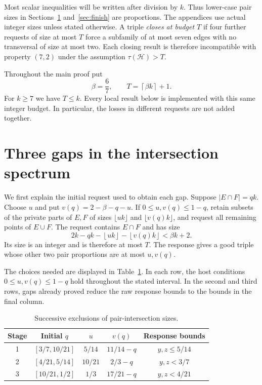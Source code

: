 \documentclass[11pt]{article}
\numberwithin{equation}{section}
\theoremstyle{definition}
\theoremstyle{remark}
\newcommand{\HH}{\mathcal H}
\newcommand{\ceil}[1]{\left\lceil #1\right\rceil}
\newcommand{\floor}[1]{\left\lfloor #1\right\rfloor}
\begin{document}
Most scalar inequalities will be written after division by $k$.
Thus lower-case pair sizes in Sections~\ref{sec:gaps} and~\ref{sec:finish}
are proportions. The appendices use actual integer sizes unless stated
otherwise. A triple \emph{closes at budget $T$} if four further requests
of size at most $T$ force a subfamily of at most seven edges with no
transversal of size at most two. Each closing result is therefore
incompatible with property $(7,2)$ under the assumption $\tau(\HH)>T$.

Throughout the main proof put
\begin{equation}\label{eq:budget}
 \beta=\frac67,\qquad T=\ceil{\beta k}+1.
\end{equation}
For $k\ge7$ we have $T\le k$. Every local result below is implemented
with this same integer budget. In particular, the losses in different
requests are not added together.

\section{Three gaps in the intersection spectrum}\label{sec:gaps}
We first explain the initial request used to obtain each gap. Suppose
$|E\cap F|=qk$. Choose $u$ and put $v(q)=2-\beta-q-u$.
If $0\le u,v(q)\le1-q$, retain subsets of the private parts of $E,F$
of sizes $\lfloor uk\rfloor$ and $\lfloor v(q)k\rfloor$, and request
all remaining points of $E\cup F$. The request contains $E\cap F$ and
has size
\[
 2k-qk-\floor{uk}-\floor{v(q)k}<\beta k+2.
\]
Its size is an integer and is therefore at most $T$. The response gives
a good triple whose other two pair proportions are at most $u,v(q)$.

The choices needed are displayed in Table~\ref{tab:gaps}. In each row,
the host conditions $0\le u,v(q)\le1-q$ hold throughout the stated
interval. In the second and third rows, gaps already proved reduce the
raw response bounds to the bounds in the final column.
\begin{table}[ht]
\centering
\begin{tabular}{ccccc}
\toprule
Stage & Initial $q$ & $u$ & $v(q)$ & Response bounds\\
\midrule
1 & $[3/7,10/21]$ & $5/14$ & $11/14-q$ & $y,z\le5/14$\\
2 & $[4/21,5/14]$ & $10/21$ & $2/3-q$ & $y,z<3/7$\\
3 & $[10/21,1/2]$ & $1/3$ & $17/21-q$ & $y,z<4/21$\\
\bottomrule
\end{tabular}
\caption{Successive exclusions of pair-intersection sizes.}\label{tab:gaps}
\end{table}
\end{document}
